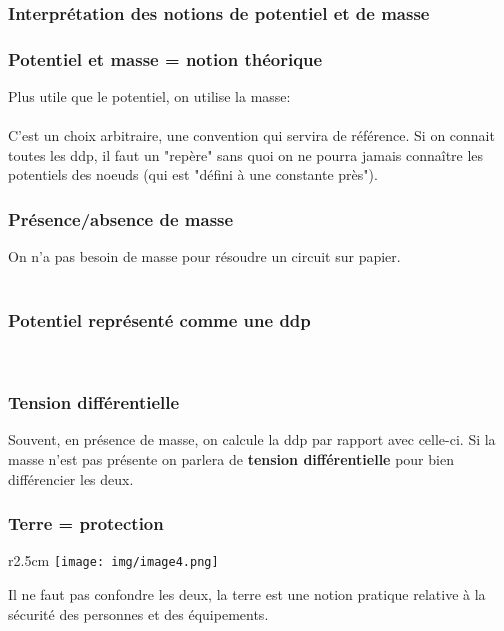 \subsubsection{Interprétation des notions de potentiel et de masse}
\subsubsection{Potentiel et masse = notion théorique}
Plus utile que le potentiel, on utilise la masse:\\
\ \\

C'est un choix arbitraire, une convention qui servira de référence.
Si on connait toutes les ddp, il faut un "repère" sans quoi on ne pourra jamais connaître les potentiels des noeuds (qui est "défini à une constante près").

\subsubsection{Présence/absence de masse}
On n'a pas besoin de masse pour résoudre un circuit sur papier.\\
\ \\

\subsubsection{Potentiel représenté comme une ddp}
\ \\

\subsubsection{Tension différentielle}
Souvent, en présence de masse, on calcule la ddp par rapport avec celle-ci. Si la masse n'est pas présente on parlera de \textbf{tension différentielle} pour bien différencier les deux.

\subsubsection{Terre = protection}
\begin{wrapfigure}[5]{r}{2.5cm}
	\texttt{[image: img/image4.png]}
\end{wrapfigure}
Il ne faut pas confondre les deux, la terre est une notion pratique relative à la sécurité des personnes et des équipements.

